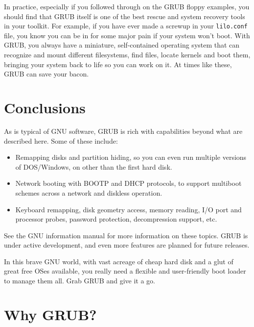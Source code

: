 \documentclass{article}
\begin{document}
In practice, especially if you followed through on the GRUB floppy examples, you should find that GRUB itself is one of the best rescue and system recovery tools in your toolkit. For example, if you have ever made a screwup in your \texttt{lilo.conf} file, you know you can be in for some major pain if your system won't boot. With GRUB, you always have a miniature, self-contained operating system that can recognize and mount different filesystems, find files, locate kernels and boot them, bringing your system back to life so you can work on it. At times like these, GRUB can save your bacon.













\section{Conclusions}

As is typical of GNU software, GRUB is rich with capabilities beyond what are described here. Some of these include:

\begin{itemize}
    \item Remapping disks and partition hiding, so you can even run multiple versions of DOS/Windows, on other than the first hard disk.
    \item Network booting with BOOTP and DHCP protocols, to support multiboot schemes across a network and diskless operation.
    \item Keyboard remapping, disk geometry access, memory reading, I/O port and processor probes, password protection, decompression support, etc.
\end{itemize}

See the GNU information manual for more information on these topics. GRUB is under active development, and even more features are planned for future releases.

In this brave GNU world, with vast acreage of cheap hard disk and a glut of great free OSes available, you really need a flexible and user-friendly boot loader to manage them all. Grab GRUB and give it a go.

\section{Why GRUB?}
\label{sec-why-grub}
\end{document}
